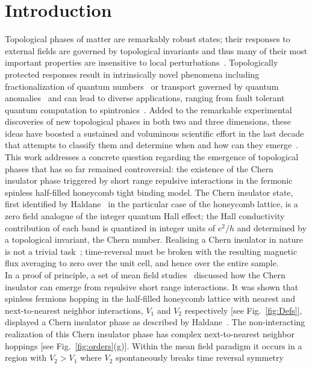 \documentclass[aps,prx,10pt,twocolumn,floatfix,superscriptaddress,showpacs,numerical,footinbib]{revtex4-1}
\begin{document}
\section{Introduction}
%
Topological phases of matter are remarkably robust states; their responses to external fields are
governed by topological invariants and thus many of their most important properties are insensitive to local perturbations~\cite{HK10,QZ11}.
%
Topologically protected responses result in intrinsically novel phenomena
including fractionalization of quantum numbers~\cite{Nayak2008} or transport governed by quantum anomalies~\cite{V03}
and can lead to diverse applications, ranging from fault tolerant quantum computation to spintronics~\cite{HK10,QZ11,Nayak2008}.
%
Added to the remarkable experimental discoveries of new topological phases in both two and three dimensions,
these ideas have boosted a sustained and voluminous scientific effort in the last decade that attempts to classify them 
and determine when and how can they emerge~\cite{S14}.\\
%
This work addresses a concrete question regarding the emergence of topological phases that has so far remained controversial: 
the existence of the Chern insulator phase triggered by short range repulsive interactions in the
fermonic spinless half-filled honeycomb tight binding model.
%
The Chern insulator state, first identified by Haldane~\cite{H88} in the particular case of the honeycomb lattice, is a zero field analogue of the
integer quantum Hall effect; the Hall conductivity contribution of each band is quantized in integer units of $e^2/h$ and determined by a topological invariant, the Chern number.
%
Realising a Chern insulator in nature is not a trivial task~\cite{CZF13}; time-reversal must be broken with
the resulting magnetic flux averaging to zero over the unit cell, and hence over the entire sample.\\
%
In a proof of principle, a set of mean field studies~\cite{RQHZ08,WF10,PR12,GCC13} 
discussed how the Chern insulator can emerge from repulsive short range interactions. 
%
It was shown that spinless fermions hopping in the half-filled honeycomb lattice with nearest and next-to-nearest neighbor interactions, $V_{1}$ and $V_{2}$ respectively 
[see Fig.~\ref{fig:Defs}], displayed a Chern insulator phase as described by Haldane~\cite{H88}.
%
The non-interacting realization of this Chern insulator phase has complex next-to-nearest neighbor hoppings [see Fig.~\ref{fig:orders}(g)].
%
Within the mean field paradigm it occurs in a region with $V_{2}>V_{1}$ where $V_{2}$ spontaneously breaks time reversal symmetry 
\end{document}
